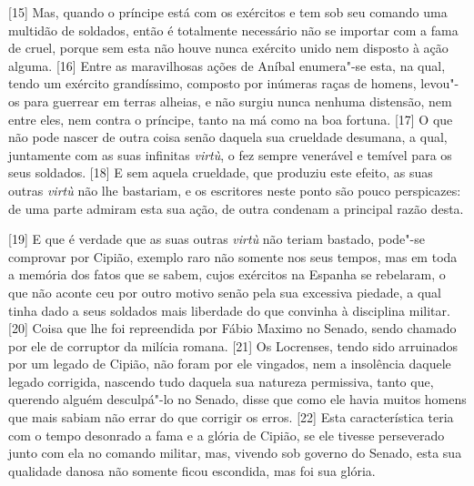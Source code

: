 {[}15{]} Mas, quando o príncipe está com os exércitos e tem sob seu
comando uma multidão de soldados, então é totalmente necessário não se
importar com a fama de cruel, porque sem esta não houve nunca exército
unido nem disposto à ação alguma. {[}16{]} Entre as maravilhosas ações
de Aníbal enumera"-se esta, na qual,
tendo um exército grandíssimo, composto por inúmeras raças de homens,
levou"-os para guerrear em terras alheias, e não surgiu nunca nenhuma
distensão, nem entre eles, nem contra o príncipe, tanto na má como na
boa fortuna. {[}17{]} O que não pode nascer de outra coisa senão daquela
sua crueldade desumana, a qual, juntamente com as suas infinitas
\emph{virtù}, o fez sempre venerável e temível para os seus soldados.
{[}18{]} E sem aquela crueldade, que produziu este efeito, as suas
outras \emph{virtù} não lhe bastariam, e os escritores neste ponto são
pouco perspicazes: de uma parte admiram esta sua ação, de outra condenam
a principal razão desta.

{[}19{]} E que é verdade que as suas outras \emph{virtù} não teriam
bastado, pode"-se comprovar por Cipião, exemplo raro não somente nos seus
tempos, mas em toda a memória dos fatos que se sabem, cujos exércitos na
Espanha se rebelaram, o que não aconte ceu por outro motivo senão pela
sua excessiva piedade, a qual tinha dado a seus soldados mais liberdade
do que convinha à disciplina militar. {[}20{]} Coisa que lhe foi
repreendida por Fábio Maximo no Senado, sendo chamado por ele de corruptor
da milícia romana. {[}21{]} Os Locrenses, tendo sido arruinados por um
legado de Cipião, não foram por ele vingados, nem a insolência daquele
legado corrigida, nascendo tudo daquela sua natureza permissiva, tanto
que, querendo alguém desculpá"-lo no Senado, disse que como ele havia
muitos homens que mais sabiam não errar do que corrigir os erros.
{[}22{]} Esta característica teria com o tempo desonrado a fama e a
glória de Cipião, se ele tivesse perseverado junto com ela no comando
militar, mas, vivendo sob governo do Senado, esta sua
qualidade danosa não somente ficou escondida, mas foi sua glória.


